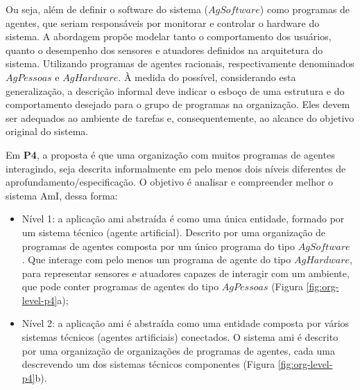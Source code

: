     Ou seja, além de definir o software do sistema ($AgSoftware$) como programas de agentes, que seriam responsáveis por monitorar e controlar o hardware do sistema. A abordagem propõe modelar tanto o comportamento dos usuários, quanto o desempenho dos sensores e atuadores definidos na arquitetura do sistema. Utilizando programas de agentes racionais, respectivamente denominados $AgPessoas$ e $AgHardware$. À medida do possível, considerando esta generalização, a descrição informal deve indicar o esboço de uma estrutura e do comportamento desejado para o grupo de programas na organização. Eles devem ser adequados ao ambiente de tarefas e, consequentemente, ao alcance do objetivo original do sistema.
    
    Em \textbf{P4}, a proposta é que uma organização com muitos programas de agentes interagindo, seja descrita informalmente em pelo menos dois níveis diferentes de aprofundamento/especificação. O objetivo é analisar e compreender melhor o sistema AmI, dessa forma: 
    
    \begin{itemize}
        
        \item Nível 1: a aplicação \acrshort{ami} abstraída é como uma única entidade, formado por um sistema técnico (agente artificial). Descrito por uma organização de programas de agentes composta por um único programa do tipo $AgSoftware$ . Que interage com pelo menos um programa de agente do tipo $AgHardware$, para representar sensores e atuadores capazes de interagir com um ambiente, que pode conter programas de agentes do tipo $AgPessoas$ (Figura \ref{fig:org-level-p4}a); 
        
        \item Nível 2:  a aplicação \acrshort{ami} é abstraída como uma entidade composta por vários sistemas técnicos (agentes artificiais) conectados. O sistema \acrshort{ami} é descrito por uma organização de organizações de programas de agentes, cada uma descrevendo um dos sistemas técnicos componentes (Figura \ref{fig:org-level-p4}b). 
    
    \end{itemize}
    
    \begin{figure}[h!]
        \centering
    \end{figure}
    
